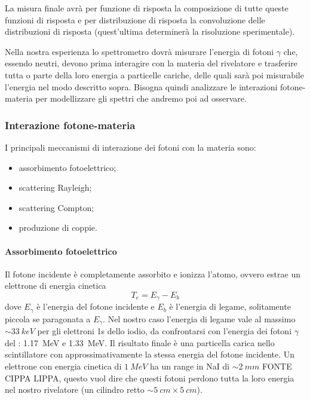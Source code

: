 La misura finale avrà per funzione di risposta la composizione di tutte queste funzioni di risposta e per distribuzione di risposta la convoluzione delle distribuzioni di risposta (quest'ultima determinerà la risoluzione sperimentale).

Nella nostra esperienza lo spettrometro dovrà misurare l'energia di fotoni $\gamma$ che, essendo neutri, devono prima interagire con la materia del rivelatore e trasferire tutta o parte della loro energia a particelle cariche, delle quali sarà poi misurabile l'energia nel modo descritto sopra. Bisogna quindi analizzare le interazioni fotone-materia per modellizzare gli spettri che andremo poi ad osservare.


\subsubsection{Interazione fotone-materia}
I principali meccanismi di interazione dei fotoni con la materia sono:
\begin{itemize}
	\item assorbimento fotoelettrico;
	\item scattering Rayleigh;
	\item scattering Compton;
	\item produzione di coppie.
\end{itemize}
  
 \paragraph{Assorbimento fotoelettrico}
 Il fotone incidente è completamente assorbito e ionizza l'atomo, ovvero estrae un elettrone di energia cinetica 
 \begin{equation} \label{eq:fotoelettrico}
 T_e = E_{\gamma} - E_b
 \end{equation} 
 dove $E_{\gamma}$ è l'energia del fotone incidente e $E_b$ è l'energia di legame, solitamente piccola se paragonata a $E_{\gamma}$. Nel nostro caso l'energia di legame vale al massimo $\sim \SI{33}{keV}$ per gli elettroni 1s dello iodio, da confrontarsi con l'energia dei fotoni $\gamma$ del \co\;: \SI{1.17}{MeV} e \SI{1.33}{MeV}. Il risultato finale è una particella carica nello scintillatore con approssimativamente la stessa energia del fotone incidente.
 Un elettrone con energia cinetica di $\SI{1}{MeV}$ ha un range in NaI di $\sim \SI{2}{mm}$ FONTE CIPPA LIPPA, questo vuol dire che questi fotoni perdono tutta la loro energia nel nostro rivelatore (un cilindro retto $\sim \SI{5}{cm} \times \SI{5}{cm}$). 

